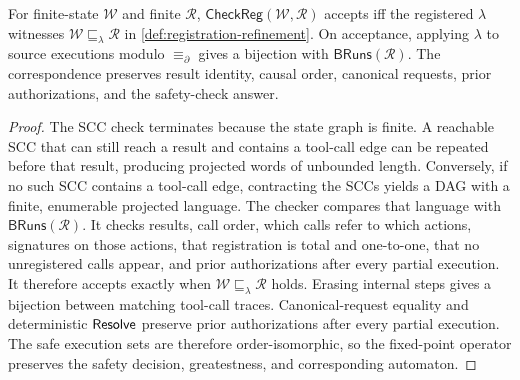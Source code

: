\begin{lemma}
\label{lem:registration-reflection}
For finite-state \(\mathcal W\) and finite \(\mathcal R\), \(\mathsf{CheckReg}(\mathcal W,\mathcal R)\) accepts iff the registered \(\lambda\) witnesses \(\mathcal W\sqsubseteq_\lambda\mathcal R\) in \cref{def:registration-refinement}.
On acceptance, applying \(\lambda\) to source executions modulo \(\equiv_\partial\) gives a bijection with \(\mathsf{BRuns}(\mathcal R)\).
The correspondence preserves result identity, causal order, canonical requests, prior authorizations, and the safety-check answer.
\end{lemma}
\begin{proof}
The SCC check terminates because the state graph is finite.
A reachable SCC that can still reach a result and contains a tool-call edge can be repeated before that result, producing projected words of unbounded length.
Conversely, if no such SCC contains a tool-call edge, contracting the SCCs yields a DAG with a finite, enumerable projected language.
The checker compares that language with \(\mathsf{BRuns}(\mathcal R)\).
It checks results, call order, which calls refer to which actions, signatures on those actions, that registration is total and one-to-one, that no unregistered calls appear, and prior authorizations after every partial execution.
It therefore accepts exactly when \(\mathcal W\sqsubseteq_\lambda\mathcal R\) holds.
Erasing internal steps gives a bijection between matching tool-call traces.
Canonical-request equality and deterministic \(\mathsf{Resolve}\) preserve prior authorizations after every partial execution.
The safe execution sets are therefore order-isomorphic, so the fixed-point operator preserves the safety decision, greatestness, and corresponding automaton.
\end{proof}

